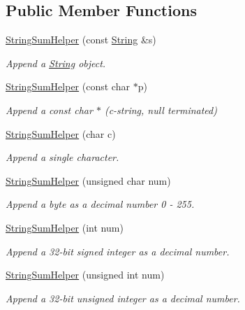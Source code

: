 \subsection*{Public Member Functions}
\begin{DoxyCompactItemize}
\item 
\hyperlink{class_string_sum_helper_ae7676b662b830bbc8731f8b72f9413bb}{String\+Sum\+Helper} (const \hyperlink{class_string}{String} \&s)
\begin{DoxyCompactList}\small\item\em Append a \hyperlink{class_string}{String} object. \end{DoxyCompactList}\item 
\hyperlink{class_string_sum_helper_a73893e195336a0bcea77b16f4b35b422}{String\+Sum\+Helper} (const char $\ast$p)
\begin{DoxyCompactList}\small\item\em Append a const char $\ast$ (c-\/string, null terminated) \end{DoxyCompactList}\item 
\hyperlink{class_string_sum_helper_a529d5741ae2d4afeaa3068bff4f3b599}{String\+Sum\+Helper} (char c)
\begin{DoxyCompactList}\small\item\em Append a single character. \end{DoxyCompactList}\item 
\hyperlink{class_string_sum_helper_ac8f1e6c222659795a6aca08ad0872bec}{String\+Sum\+Helper} (unsigned char num)
\begin{DoxyCompactList}\small\item\em Append a byte as a decimal number 0 -\/ 255. \end{DoxyCompactList}\item 
\hyperlink{class_string_sum_helper_acb28b89b1f39f1140ab097439c967e22}{String\+Sum\+Helper} (int num)
\begin{DoxyCompactList}\small\item\em Append a 32-\/bit signed integer as a decimal number. \end{DoxyCompactList}\item 
\hyperlink{class_string_sum_helper_a13f4d006d1f67d0d2556152f4d16e4e9}{String\+Sum\+Helper} (unsigned int num)
\begin{DoxyCompactList}\small\item\em Append a 32-\/bit unsigned integer as a decimal number. \end{DoxyCompactList}\item 

\end{DoxyCompactItemize}
